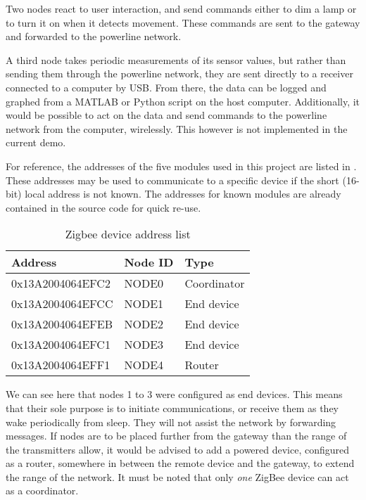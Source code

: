 Two nodes react to user interaction, and send commands either to dim a lamp or
to turn it on when it detects movement. These commands are sent to the gateway
and forwarded to the powerline network.

A third node takes periodic measurements of its sensor values, but rather than
sending them through the powerline network, they are sent directly to a receiver
connected to a computer by USB. From there, the data can be logged and graphed
from a MATLAB or Python script on the host computer. Additionally, it would be
possible to act on the data and send commands to the powerline network from the
computer, wirelessly. This however is not implemented in the current demo.

For reference, the addresses of the five modules used in this project are listed
in . These addresses may be used to communicate to a specific
device if the short (16-bit) local address is not known. The addresses for known
modules are already contained in the source code for quick re-use.

\begin{table}[h]
  \centering
  \begin{tabular}{l|l|l}
    Address & Node ID & Type \\
    \hline
    0x13A2004064EFC2 & NODE0 & Coordinator \\
    0x13A2004064EFCC & NODE1 & End device \\
    0x13A2004064EFEB & NODE2 & End device \\
    0x13A2004064EFC1 & NODE3 & End device \\
    0x13A2004064EFF1 & NODE4 & Router \\
  \end{tabular}
  \caption{Zigbee device address list}
  \label{tab:addresses}
\end{table}

We can see here that nodes 1 to 3 were configured as end devices. This means
that their sole purpose is to initiate communications, or receive them as they
wake periodically from sleep. They will not assist the network by forwarding
messages. If nodes are to be placed further from the gateway than the range of
the transmitters allow, it would be advised to add a powered device, configured
as a router, somewhere in between the remote device and the gateway, to extend
the range of the network. It must be noted that only \emph{one} ZigBee device
can act as a coordinator. 

